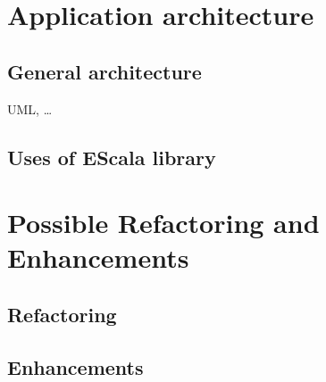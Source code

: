 \documentclass[12pt, accentcolor=tud9c, linedtoc, bigchapter, colorback, noresetcounter, numbersubsubsec]{tudreport}
\begin{document}
\chapter{Application architecture}

\section{General architecture}
UML, \dots

\section{Uses of EScala library}

\chapter{Possible Refactoring and Enhancements}

\section{Refactoring}

\section{Enhancements}
\end{document}
